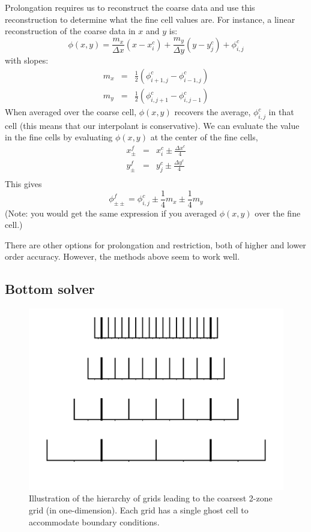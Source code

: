 Prolongation requires us to reconstruct the coarse data and use
this reconstruction to determine what the fine cell values are.  For
instance, a linear reconstruction of the coarse data in $x$ and $y$ is:
\begin{equation}
\phi(x,y) = \frac{m_x}{\Delta x} (x - x_i^c) + 
            \frac{m_y}{\Delta y} (y - y_j^c) + \phi_{i,j}^c
\end{equation}
with slopes:
\begin{eqnarray}
m_x &=& \frac{1}{2}({\phi_{i+1,j}^c - \phi_{i-1,j}^c}) \\
m_y &=& \frac{1}{2}({\phi_{i,j+1}^c - \phi_{i,j-1}^c})
\end{eqnarray}
%
When averaged over the coarse cell, $\phi(x,y)$ recovers the average,
$\phi_{i,j}^c$ in that cell (this means that our interpolant is
conservative).  We can evaluate the value in the fine cells by
evaluating $\phi(x,y)$ at the center of the fine cells,
\begin{eqnarray}
x_\pm^f &=& x_i^c \pm \frac{\Delta x^c}{4} \\
y_\pm^f &=& y_j^c \pm \frac{\Delta y^c}{4} \\
\end{eqnarray}
This gives
\begin{equation}
\phi_{\pm\pm}^f = \phi_{i,j}^c \pm \frac{1}{4}m_x \pm \frac{1}{4}m_y
\end{equation}
(Note: you would get the same expression if you averaged $\phi(x,y)$ over
the fine cell.)

There are other options for prolongation and restriction, both of
higher and lower order accuracy.  However, the methods above seem to
work well.

\subsection{Bottom solver}

\begin{figure}[t]
\centering
\includegraphics[width=\linewidth]{mgtower}
\caption[A multigrid hierarchy]{\label{fig:mgtower} Illustration of
  the hierarchy of grids leading to the coarsest 2-zone grid (in
  one-dimension).  Each grid has a single ghost cell to accommodate
  boundary conditions.}
\end{figure}

